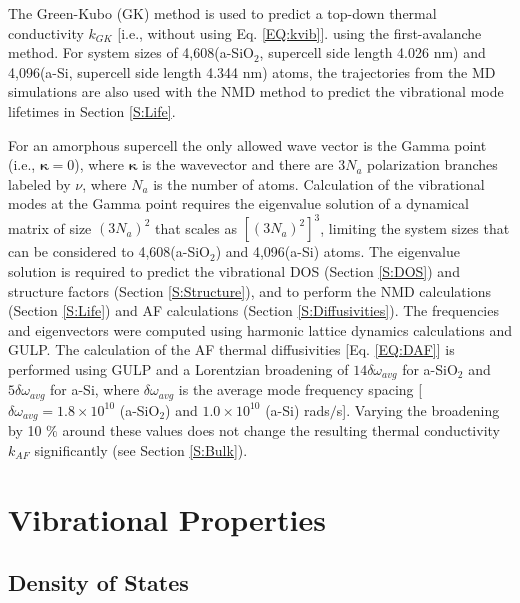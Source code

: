 \documentclass[aps,prb,twocolumn,superscriptaddress,footinbib,amsmath,amssymb,floatfix]{revtex4}
\begin{document}
The Green-Kubo (GK) method is used to predict a top-down thermal 
conductivity $k_{GK}$ [i.e., without using Eq. \eqref{EQ:kvib}].
\cite{mcquarrie_statistical_2000} using the 
first-avalanche method.\cite{chen_how_2010} 
For system sizes of 4,608(a-SiO$_2$, supercell side length 4.026 nm) 
and 4,096(a-Si, supercell side length 4.344 nm) atoms, 
the trajectories from 
the MD simulations are 
also used with the NMD method to predict 
the vibrational mode lifetimes in Section \ref{S:Life}. 

For an amorphous supercell 
the only allowed wave vector is the Gamma point 
(i.e., $\pmb{\kappa}=0$),  
where $\pmb{\kappa}$ is the wavevector and there are $3N_a$ 
polarization 
branches labeled by $\nu$, where $N_a$ is the number of atoms. 
Calculation of the vibrational modes at the Gamma point  
requires the eigenvalue solution of a dynamical matrix of size 
$(3N_a)^2$ that scales as $[(3N_a)^2]^3$, limiting the system 
sizes that can be considered to 4,608(a-SiO$_2$) and 4,096(a-Si) 
atoms. 
The eigenvalue solution is required to predict the vibrational 
DOS (Section \ref{S:DOS}) and structure factors 
(Section \ref{S:Structure}), and to perform the NMD calculations  
(Section \ref{S:Life})  
and AF calculations (Section \ref{S:Diffusivities}). 
The frequencies and eigenvectors were computed using harmonic
lattice dynamics calculations and GULP.\cite{gale_general_2003} 
The calculation of the AF thermal diffusivities 
[Eq. \eqref{EQ:DAF}] is performed using GULP and a Lorentzian 
broadening of $14\delta\omega_{avg}$ for a-SiO$_2$ and 
$5\delta\omega_{avg}$ for a-Si, 
where $\delta\omega_{avg}$ is the average mode 
frequency spacing 
[$\delta\omega_{avg} = 1.8 \times 10^{10}$ (a-SiO$_2$) 
and $1.0 \times 10^{10}$ (a-Si) rads$/$s].
\cite{feldman_thermal_1993,feldman_numerical_1999}  
Varying the broadening by 10 $\%$ around these values does not 
change the resulting thermal conductivity $k_{AF}$ significantly 
(see Section \ref{S:Bulk}).

\section{\label{S:Vibrational}Vibrational Properties}

\subsection{\label{S:DOS}Density of States}
\end{document}
